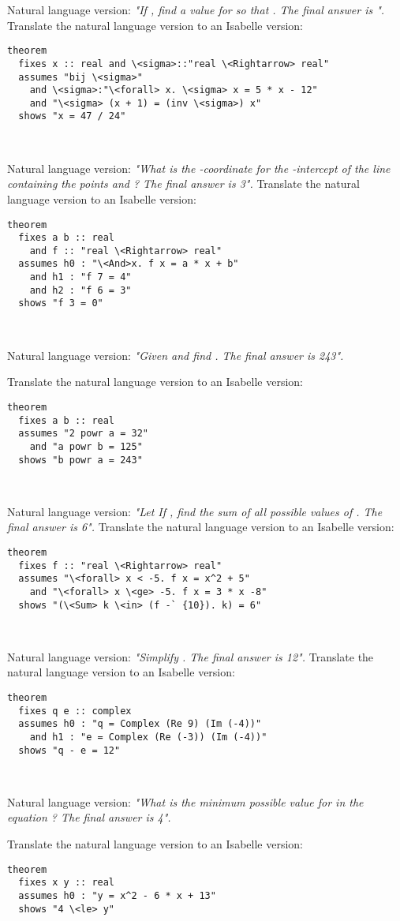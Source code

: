\documentclass{article}
\begin{document}
\begin{boxB}
Natural language version: \emph{"If , find a value for  so that . The final answer is ".} Translate the natural language version to an Isabelle version:
\begin{lstlisting}
theorem
  fixes x :: real and \<sigma>::"real \<Rightarrow> real"
  assumes "bij \<sigma>"
    and \<sigma>:"\<forall> x. \<sigma> x = 5 * x - 12"
    and "\<sigma> (x + 1) = (inv \<sigma>) x" 
  shows "x = 47 / 24"
\end{lstlisting}

\ 

Natural language version: \emph{"What is the -coordinate for the -intercept of the line containing the points  and ? The final answer is 3".}
Translate the natural language version to an Isabelle version:
\begin{lstlisting}
theorem
  fixes a b :: real
    and f :: "real \<Rightarrow> real"
  assumes h0 : "\<And>x. f x = a * x + b"
    and h1 : "f 7 = 4"
    and h2 : "f 6 = 3"
  shows "f 3 = 0"
\end{lstlisting}
  
  \
  
Natural language version: \emph{"Given  and  find . The final answer is 243".}

Translate the natural language version to an Isabelle version:
\begin{lstlisting}
theorem
  fixes a b :: real
  assumes "2 powr a = 32"
    and "a powr b = 125"
  shows "b powr a = 243"
\end{lstlisting}
  
\
  
Natural language version: \emph{"Let If , find the sum of all possible values of . The final answer is 6".}
Translate the natural language version to an Isabelle version:

\begin{lstlisting}
theorem
  fixes f :: "real \<Rightarrow> real"
  assumes "\<forall> x < -5. f x = x^2 + 5"
    and "\<forall> x \<ge> -5. f x = 3 * x -8"
  shows "(\<Sum> k \<in> (f -` {10}). k) = 6" 
\end{lstlisting}

\

Natural language version: \emph{"Simplify . The final answer is 12".}
Translate the natural language version to an Isabelle version:
\begin{lstlisting}
theorem
  fixes q e :: complex
  assumes h0 : "q = Complex (Re 9) (Im (-4))"
    and h1 : "e = Complex (Re (-3)) (Im (-4))"
  shows "q - e = 12"
\end{lstlisting}

\

Natural language version: \emph{"What is the minimum possible value for  in the equation ? The final answer is 4".}

Translate the natural language version to an Isabelle version:
\begin{lstlisting}
theorem
  fixes x y :: real
  assumes h0 : "y = x^2 - 6 * x + 13"
  shows "4 \<le> y"
\end{lstlisting}
\end{boxB}
\end{document}
